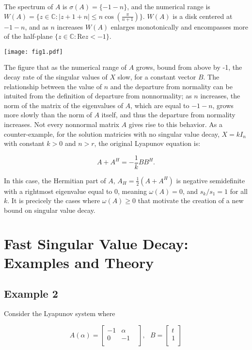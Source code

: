 \documentclass[12pt]{scrartcl}
\begin{document}
The spectrum of $A$ is $\sigma(A)=\{-1-n\}$, and the numerical range is $W(A)=\{z \in \mathbb{C} : |z+1+n| \leq n \cos (\frac{\pi}{n+1})\}$. $W(A)$ is a disk centered at $-1-n$, and as $n$ increases $W(A)$ enlarges monotonically and encompasses more of the half-plane $\{z \in \mathbb{C} : \text{Re}z<-1 \}$.

\begin{center}
\texttt{[image: fig1.pdf]}
\end{center}

The figure that as the numerical range of $A$ grows, bound from above by -1, the decay rate of the singular values of $X$ slow, for a constant vector $B$. The relationship between the value of $n$ and the departure from normality can be intuited from the definition of departure from nonnormality; as $n$ increases, the norm of the matrix of the eigenvalues of $A$, which are equal to $-1-n$, grows more slowly than the norm of $A$ itself, and thus the departure from normality increases. 
Not every nonnormal matrix $A$ gives rise to this behavior. As a counter-example, for the solution matricies with no singular value decay, $X=kI_{n}$ with constant $k>0$ and $n>r$, the original Lyapunov equation is: 

$$A+A^{H}=-\frac{1}{k}BB^{H}.$$

In this case, the Hermitian part of $A$, $A_{H} = \frac{1}{2} (A+A^{H})$ is negative semidefinite with a rightmost eigenvalue equal to 0, meaning $\omega(A)=0$, and $s_{k}/s_{1}=1$ for all $k$. It is precicely the cases where $\omega(A) \geq 0$ that motivate the creation of a new bound on singular value decay. 

\section{Fast Singular Value Decay: Examples and Theory}


\subsection{Example 2}

Consider the Lyapunov system where 

\[
A(\alpha) =
 \begin{bmatrix}
  -1 & \alpha \\
  0 & -1 &  \\
 \end{bmatrix}, \text{      }
B =
 \begin{bmatrix}
  t \\
  1  \\
 \end{bmatrix}
\] 
\end{document}
